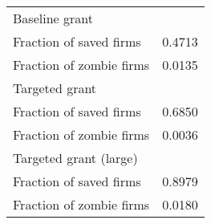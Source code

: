  \begin{tabular}{lc} \hline \hline 
Baseline grant & \\ 
Fraction of saved firms &   0.4713 \\ 
Fraction of zombie firms &   0.0135 \\ 
\hline 
Targeted grant & \\ 
Fraction of saved firms &   0.6850 \\  
Fraction of zombie firms &   0.0036 \\ 
Targeted grant (large) & \\ 
Fraction of saved firms &   0.8979 \\  
Fraction of zombie firms &   0.0180 \\ 
\hline \hline 
 \end{tabular} 

